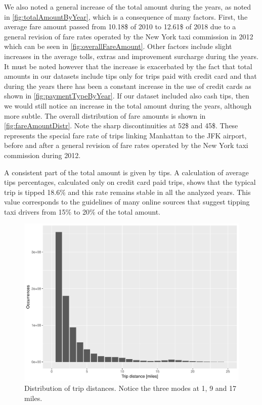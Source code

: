 \documentclass{acm_proc_article-sp-sigmod09}
\begin{document}
We also noted a general increase of the total amount during the years, as noted in \cref{fig:totalAmountByYear}, which is a consequence of many factors. First, the average fare amount passed from 10.18\$ of 2010 to 12.61\$ of 2018 due to a general revision of fare rates operated by the New York taxi commission in 2012 which can be seen in \cref{fig:overallFareAmount}. Other factors include slight increases in the average tolls, extras and improvement surcharge during the years. It must be noted however that the increase is exacerbated by the fact that total amounts in our datasets include tips only for trips paid with credit card and that during the years there has been a constant increase in the use of credit cards as shown in \cref{fig:paymentTypeByYear}. If our dataset included also cash tips, then we would still notice an increase in the total amount during the years, although more subtle.
The overall distribution of fare amounts is shown in \cref{fig:fareAmountDistr}. Note the sharp discontinuities at 52\$ and 45\$. These represents the special fare rate of trips linking Manhattan to the JFK airport, before and after a general revision of fare rates operated by the New York taxi commission during 2012.

A consistent part of the total amount is given by tips. A calculation of average tips percentages, calculated only on credit card paid trips, shows that the typical trip is tipped 18.6\% and this rate remains stable in all the analyzed years. This value corresponds to the guidelines of many online sources that suggest tipping taxi drivers from 15\% to 20\% of the total amount.

\begin{figure}
	\centering
	\includegraphics[width=1\columnwidth]{resources/base_plots/trip_distance_distr.pdf}
	\caption{Distribution of trip distances. Notice the three modes at 1, 9 and 17 miles.}
	\label{fig:tripDistanceDistr}
\end{figure}
\end{document}
